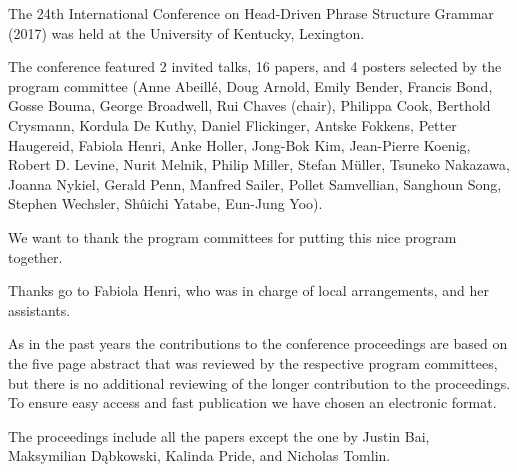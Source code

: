 The 24th International Conference on Head-Driven Phrase Structure Grammar (2017) was held at
the University of Kentucky, Lexington.

The conference featured 2 invited talks, 16 papers, and 4 posters selected by the program committee 
(Anne Abeillé,
Doug Arnold,
Emily Bender,
Francis Bond,
Gosse Bouma,
George Broadwell,
Rui Chaves (chair),
Philippa Cook,
Berthold Crysmann,
Kordula De Kuthy,
Daniel Flickinger,
Antske Fokkens,
Petter Haugereid,
Fabiola Henri,
Anke Holler,
Jong-Bok Kim,
Jean-Pierre Koenig,
Robert D. Levine,
Nurit Melnik,
Philip Miller,
Stefan Müller,
Tsuneko Nakazawa,
Joanna Nykiel,
Gerald Penn,
Manfred Sailer,
Pollet Samvellian,
Sanghoun Song,
Stephen Wechsler,
Shûichi Yatabe,
Eun-Jung Yoo).


We want to thank the program committees for putting this nice program together.

Thanks go to Fabiola Henri, who was
in charge of local arrangements, and her assistants.
 

As in the past years the contributions to the conference proceedings are based on the five page abstract
that was reviewed by the respective program committees, but there is no additional reviewing of the
longer contribution to the proceedings.
To ensure easy access and fast publication we have chosen an electronic format.

The proceedings include all the papers except the one by Justin Bai,  Maksymilian Dąbkowski, Kalinda
Pride,  and Nicholas Tomlin. 


